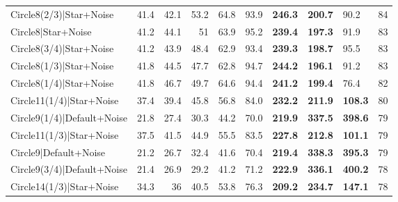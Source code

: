 \begin{tabular}{lrrrrllllr}
 Circle8(2/3)|Star+Noise                              &         41.4 &         42.1 &         53.2 &            64.8 & 93.9           & \textbf{246.3} & \textbf{200.7} & 90.2           &           84 \\
 Circle8|Star+Noise                                   &         41.2 &         44.1 &         51   &            63.9 & 95.2           & \textbf{239.4} & \textbf{197.3} & 91.9           &           83 \\
 Circle8(3/4)|Star+Noise                              &         41.2 &         43.9 &         48.4 &            62.9 & 93.4           & \textbf{239.3} & \textbf{198.7} & 95.5           &           83 \\
 Circle8(1/3)|Star+Noise                              &         41.8 &         44.5 &         47.7 &            62.8 & 94.7           & \textbf{244.2} & \textbf{196.1} & 91.2           &           83 \\
 Circle8(1/4)|Star+Noise                              &         41.8 &         46.7 &         49.7 &            64.6 & 94.4           & \textbf{241.2} & \textbf{199.4} & 76.4           &           82 \\
 Circle11(1/4)|Star+Noise                             &         37.4 &         39.4 &         45.8 &            56.8 & 84.0           & \textbf{232.2} & \textbf{211.9} & \textbf{108.3} &           80 \\
 Circle9(1/4)|Default+Noise                           &         21.8 &         27.4 &         30.3 &            44.2 & 70.0           & \textbf{219.9} & \textbf{337.5} & \textbf{398.6} &           79 \\
 Circle11(1/3)|Star+Noise                             &         37.5 &         41.5 &         44.9 &            55.5 & 83.5           & \textbf{227.8} & \textbf{212.8} & \textbf{101.1} &           79 \\
 Circle9|Default+Noise                                &         21.2 &         26.7 &         32.4 &            41.6 & 70.4           & \textbf{219.4} & \textbf{338.3} & \textbf{395.3} &           79 \\
 Circle9(3/4)|Default+Noise                           &         21.4 &         26.9 &         29.2 &            41.2 & 71.2           & \textbf{222.9} & \textbf{336.1} & \textbf{400.2} &           78 \\
 Circle14(1/3)|Star+Noise                             &         34.3 &         36   &         40.5 &            53.8 & 76.3           & \textbf{209.2} & \textbf{234.7} & \textbf{147.1} &           78 \\

\end{tabular}
